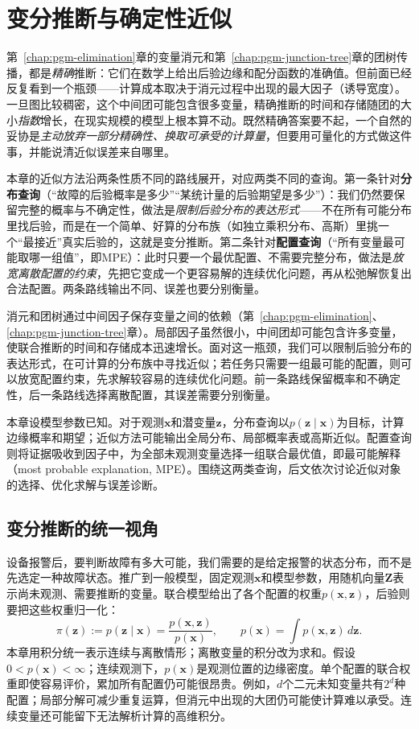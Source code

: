 \chapter{变分推断与确定性近似}
\label{chap:pgm-variational}

第~\ref{chap:pgm-elimination}章的变量消元和第~\ref{chap:pgm-junction-tree}章的团树传播，都是\emph{精确}推断：它们在数学上给出后验边缘和配分函数的准确值。但前面已经反复看到一个瓶颈——计算成本取决于消元过程中出现的最大因子（诱导宽度）。一旦图比较稠密，这个中间团可能包含很多变量，精确推断的时间和存储随团的大小\emph{指数}增长，在现实规模的模型上根本算不动。既然精确答案要不起，一个自然的妥协是\emph{主动放弃一部分精确性、换取可承受的计算量}，但要用可量化的方式做这件事，并能说清近似误差来自哪里。

本章的近似方法沿两条性质不同的路线展开，对应两类不同的查询。第一条针对\textbf{分布查询}（“故障的后验概率是多少”“某统计量的后验期望是多少”）：我们仍然要保留完整的概率与不确定性，做法是\emph{限制后验分布的表达形式}——不在所有可能分布里找后验，而是在一个简单、好算的分布族（如独立乘积分布、高斯）里挑一个“最接近”真实后验的，这就是变分推断。第二条针对\textbf{配置查询}（“所有变量最可能取哪一组值”，即MPE）：此时只要一个最优配置、不需要完整分布，做法是\emph{放宽离散配置的约束}，先把它变成一个更容易解的连续优化问题，再从松弛解恢复出合法配置。两条路线输出不同、误差也要分别衡量。

消元和团树通过中间因子保存变量之间的依赖（第~\ref{chap:pgm-elimination}、\ref{chap:pgm-junction-tree}章）。局部因子虽然很小，中间团却可能包含许多变量，使联合推断的时间和存储成本迅速增长。面对这一瓶颈，我们可以限制后验分布的表达形式，在可计算的分布族中寻找近似；若任务只需要一组最可能的配置，则可以放宽配置约束，先求解较容易的连续优化问题。前一条路线保留概率和不确定性，后一条路线选择离散配置，其误差需要分别衡量。

本章设模型参数已知。对于观测$\bm{x}$和潜变量$\bm{z}$，分布查询以$p(\bm{z}\mid\bm{x})$为目标，计算边缘概率和期望；近似方法可能输出全局分布、局部概率表或高斯近似。配置查询则将证据吸收到因子中，为全部未观测变量选择一组联合最优值，即最可能解释（most probable explanation, MPE）。围绕这两类查询，后文依次讨论近似对象的选择、优化求解与误差诊断。

\section{变分推断的统一视角}

\label{sec:pgm-variational-unified}
\label{sec:pgm-variational-duality}

设备报警后，要判断故障有多大可能，我们需要的是给定报警的状态分布，而不是先选定一种故障状态。推广到一般模型，固定观测$\bm x$和模型参数，用随机向量$\bm Z$表示尚未观测、需要推断的变量。联合模型给出了各个配置的权重$p(\bm x,\bm z)$，后验则要把这些权重归一化：
\[
  \pi(\bm z):=p(\bm z\mid\bm x)
    =\frac{p(\bm x,\bm z)}{p(\bm x)},
  \qquad p(\bm x)=\int p(\bm x,\bm z)\,d\bm z.
\]
本章用积分统一表示连续与离散情形；离散变量的积分改为求和。假设$0<p(\bm x)<\infty$；连续观测下，$p(\bm x)$是观测位置的边缘密度。单个配置的联合权重即使容易评价，累加所有配置仍可能很昂贵。例如，$d$个二元未知变量共有$2^d$种配置；局部分解可减少重复运算，但消元中出现的大团仍可能使计算难以承受。连续变量还可能留下无法解析计算的高维积分。

